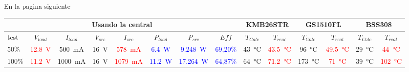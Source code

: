 
En la pagina siguiente

\begin{landscape}
    \begin{table}[H]
        \centering
        \renewcommand\theadfont{\bfseries}
        \setlength{\tabcolsep}{10pt}
        \renewcommand{\arraystretch}{1.5}
        \begin{tabular}{|l|c|c|c|c|c|c|c|c|c|c|c|c|c|}

            \hline
           \multicolumn{8}{|c|}{Usando la central} & \multicolumn{2}{|c|}{KMB26STR} & \multicolumn{2}{|c|}{GS1510FL} & \multicolumn{2}{|c|}{BSS308}                                                                                                                                                                   \\ \hline

          test                                    & $V_{load}$                     & $I_{load}$                     & $V_{src}$                      & $I_{src}$                & $P_{load}$ & $P_{src}$ & $Eff$ & $T_{Calc}$        & $T_{real}$ & $T_{Calc}$         & $T_{real}$ & $T_{Calc}$        & $T_{real}$ \\
           \hline

            50\%                                    & \textcolor{red}{\SI{12,8}{\volt}} & \SI{500}{\milli\ampere}        & \SI{16}{\volt}                 &  \textcolor{red}{\SI{578}{\milli\ampere}}& \textcolor{blue}{\SI{6,4}{\watt}}     & \textcolor{blue}{\SI{9,248}{\watt}}& \textcolor{blue}{69,20\%}       & \SI{43}{\celsius} & \textcolor{red}{\SI{43,5}{\celsius}}& \SI{96}{\celsius}  & \textcolor{red}{\SI{49,5}{\celsius}}& \SI{29}{\celsius} & \textcolor{red}{\SI{44}{\celsius}}\\ \hline
            

100\%                                    & \textcolor{red}{\SI{11,2}{\volt}} & \SI{1000}{\milli\ampere}        & \SI{16}{\volt}                 &  \textcolor{red}{\SI{1079}{\milli\ampere}}& \textcolor{blue}{\SI{11,2}{\watt}}     & \textcolor{blue}{\SI{17,264}{\watt}}& \textcolor{blue}{64,87\%}       & \SI{64}{\celsius} & \textcolor{red}{\SI{71,2}{\celsius}}& \SI{173}{\celsius}  & \textcolor{red}{\SI{71}{\celsius}}& \SI{39}{\celsius} & \textcolor{red}{\SI{102}{\celsius}}\\ \hline


\end{tabular}
\end{table}
\end{landscape}
